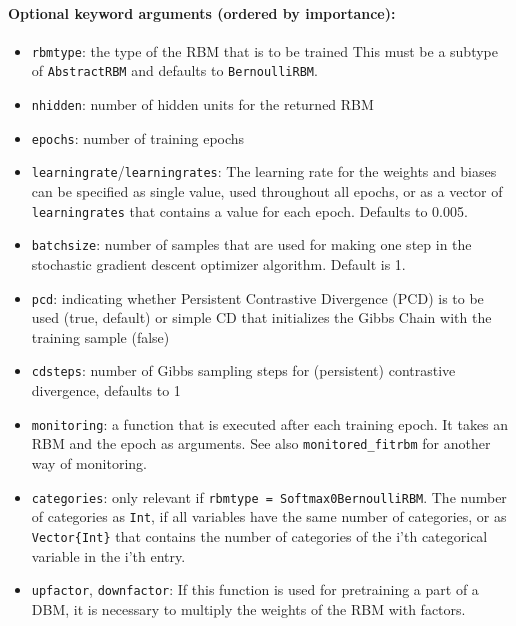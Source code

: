 \paragraph*{Optional keyword arguments (ordered by importance):}
\begin{itemize}
\item \texttt{rbmtype}: the type of the RBM that is to be trained  This must be a subtype of \texttt{AbstractRBM} and defaults to \texttt{BernoulliRBM}.


\item \texttt{nhidden}: number of hidden units for the returned RBM


\item \texttt{epochs}: number of training epochs


\item \texttt{learningrate}/\texttt{learningrates}: The learning rate for the weights and biases  can be specified as single value, used throughout all epochs, or as a vector  of \texttt{learningrates} that contains a value for each epoch. Defaults to 0.005.


\item \texttt{batchsize}: number of samples that are used for making one step in the  stochastic gradient descent optimizer algorithm. Default is 1.


\item \texttt{pcd}: indicating whether Persistent Contrastive Divergence (PCD) is to  be used (true, default) or simple CD that initializes the Gibbs Chain with  the training sample (false)


\item \texttt{cdsteps}: number of Gibbs sampling steps for (persistent)  contrastive divergence, defaults to 1


\item \texttt{monitoring}: a function that is executed after each training epoch.  It takes an RBM and the epoch as arguments.  See also \texttt{monitored\_fitrbm} for another way of monitoring.


\item \texttt{categories}: only relevant if \texttt{rbmtype = Softmax0BernoulliRBM}.  The number of categories as \texttt{Int}, if all variables have the same number  of categories, or as \texttt{Vector\{Int\}} that contains the number of categories  of the i'th categorical variable in the i'th entry.


\item \texttt{upfactor}, \texttt{downfactor}: If this function is used for pretraining a part of  a DBM, it is necessary to multiply the weights of the RBM with factors.



\end{itemize}
